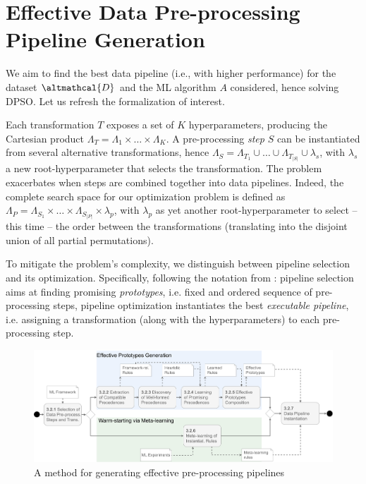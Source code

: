 \section{Effective Data Pre-processing Pipeline Generation}
\label{effective-sec:methodology}

We aim to find the best data pipeline (i.e., with higher performance) for the dataset $\altmathcal{D}$ and the ML algorithm $A$ considered, hence solving DPSO.
Let us refresh the formalization of interest.

Each transformation $T$ exposes a set of $K$ hyperparameters, producing the Cartesian product $\Lambda_T = \Lambda_1 \times \dots \times \Lambda_K$.
A pre-processing \textit{step} $S$ can be instantiated from several alternative transformations, hence $\Lambda_S = \Lambda_{T_1} \cup \ldots \cup \Lambda_{T_{|S|}} \cup \lambda_s$, with $\lambda_s$ a new root-hyperparameter that selects the transformation.
The problem exacerbates when steps are combined together into data pipelines.
Indeed, the complete search space for our optimization problem is defined as $\Lambda_P = \Lambda_{S_1} \times \ldots \times \Lambda_{S_{|P|}} \times \lambda_p$, with $\lambda_p$ as yet another root-hyperparameter to select -- this time -- the order between the transformations (translating into the disjoint union of all partial permutations).

To mitigate the problem's complexity, we distinguish between pipeline selection and its optimization.
Specifically, following the notation from \cite{quemy2019data}:
pipeline selection aims at finding promising \textit{prototypes}, i.e. fixed and ordered sequence of pre-processing steps, pipeline optimization instantiates the best \textit{executable pipeline}, i.e. assigning a transformation (along with the hyperparameters) to each pre-processing step.

\begin{figure}[t]
    \centering
    \includegraphics[width=1.0\textwidth]{chapters/data-centric/supervised/img/bpmn.pdf}
    \caption{A method for generating effective pre-processing pipelines}
    \label{effective-fig:methodology}
\end{figure}

